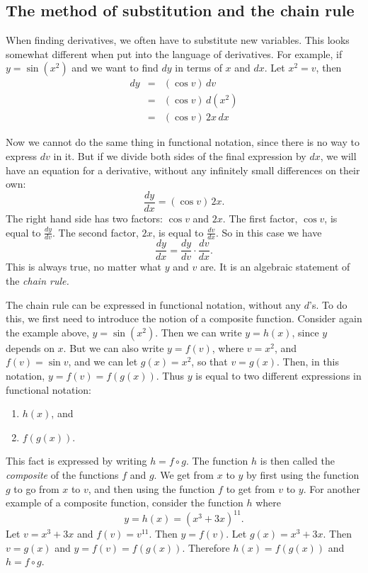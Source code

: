 \documentclass[polutonikogreek,english,twoside,openright]{article}
\begin{document}
\subsection*{The method of substitution and the chain rule}\label{chainrulestart}

When finding derivatives, we often have to substitute new variables.
This looks somewhat different when put into the language of
derivatives.  For example, if $y=\sin(x^2)$ and we want to find $dy$
in terms of $x$ and $dx$.  Let $x^2 =v$, then
\begin{eqnarray*}
  dy & = & (\cos v)\,dv\\
     & = & (\cos v)\,d(x^2)\\
     & = & (\cos v)\,2x\,dx
\end{eqnarray*}

Now we cannot do the same thing in functional notation, since there is
no way to express $dv$ in it.  But if we divide both sides of the
final expression by $dx$, we will have an equation for a derivative,
without any infinitely small differences on their own:
$$\frac{dy}{dx} = (\cos v)\,2x.$$
The right hand side has two factors: $\cos v$ and $2x$.  The first
factor, $\cos v$, is equal to $\frac{dy}{dv}$.  The second factor,
$2x$, is equal to $\frac{dv}{dx}$.  So in this case we have
$$\frac{dy}{dx} = \frac{dy}{dv} \cdot \frac{dv}{dx}.$$
This is always true, no matter what $y$ and $v$ are.  It is an
algebraic statement of the {\em chain rule.}  

The chain rule can be
expressed in functional notation, without any $d$'s.  To do this, we first need to introduce the notion of a composite function.  Consider again the example above, $y = \sin(x^2)$. Then we can write $ y = h(x)$, since $y$ depends on $x$.  But we can also write $y=f(v)$, where $v = x^2$, and $f(v) = \sin v$, and we can let $g(x)= x^2$, so that $v = g(x)$.  Then, in this notation, $y = f(v)= f(g(x))$.  Thus $y$ is equal to two different expressions in functional notation:
\begin{enumerate}
\item $h(x)$, and
\item $f(g(x))$.
\end{enumerate}
This fact is expressed by writing $h = f \circ g$.  The function $h$ is then called the {\em composite} of the functions $f$ and $g$.  We get from $x$ to $y$ by first
using the function $g$ to go from $x$ to $v$, and then using the
function $f$ to get from $v$ to $y$.  For another example of a composite function, consider the function $h$ where
$$y = h(x) = (x^3 + 3x)^{11}.$$
Let $v = x^3 + 3x$ and $f(v) = v^{11}$.  Then $y = f(v)$.  Let $g(x) = x^3 + 3x$.  Then $v= g(x)$ and $y = f(v) = f(g(x))$.  Therefore $h(x) = f(g(x))$ and $h = f\circ g$.
\end{document}
